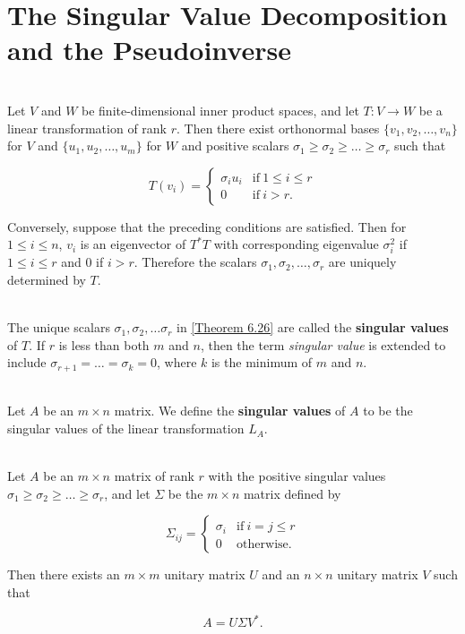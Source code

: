 \section{The Singular Value Decomposition and the Pseudoinverse}

\begin{theorem}\label{Theorem 6.26}
	\hfill\\
	Let $V$ and $W$ be finite-dimensional inner product spaces, and let $T: V \to W$ be a linear transformation of rank $r$. Then there exist orthonormal bases $\{v_1, v_2, \dots, v_n\}$ for $V$ and $\{u_1, u_2, \dots, u_m\}$ for $W$ and positive scalars $\sigma_1 \geq \sigma_2 \geq \dots \geq \sigma_r$ such that

	\[T(v_i) = \begin{cases}
			\sigma_iu_i & \text{if}\ 1 \leq i \leq r \\
			0           & \text{if}\ i > r.
		\end{cases}\]

	Conversely, suppose that the preceding conditions are satisfied. Then for $1 \leq i \leq n$, $v_i$ is an eigenvector of $T^*T$ with corresponding eigenvalue $\sigma_i^2$ if $1 \leq i \leq r$ and $0$ if $i > r$. Therefore the scalars $\sigma_1, \sigma_2, \dots, \sigma_r$ are uniquely determined by $T$.
\end{theorem}

\begin{definition}
	\hfill\\
	The unique scalars $\sigma_1,\sigma_2,\dots\sigma_r$ in  \autoref{Theorem 6.26} are called the \textbf{singular values} of $T$. If $r$ is less than both $m$ and $n$, then the term \textit{singular value} is extended to include $\sigma_{r + 1} = \dots = \sigma_k = 0$, where $k$ is the minimum of $m$ and $n$.
\end{definition}

\begin{definition}
	\hfill\\
	Let $A$ be an $m \times n$ matrix. We define the \textbf{singular values} of $A$ to be the singular values of the linear transformation $L_A$.
\end{definition}

\begin{theorem}\label{Theorem 6.27}
	\hfill\\
	Let $A$ be an $m \times n$ matrix of rank $r$ with the positive singular values $\sigma_1 \geq \sigma_2 \geq \dots \geq \sigma_r$, and let $\Sigma$ be the $m \times n$ matrix defined by

	\[\Sigma_{ij} = \begin{cases}
			\sigma_i & \text{if}\ i = j \leq r \\
			0        & \text{otherwise}.
		\end{cases}\]

	Then there exists an $m \times m$ unitary matrix $U$ and an $n \times n$ unitary matrix $V$ such that

	\[A = U\Sigma V^*.\]
\end{theorem}

